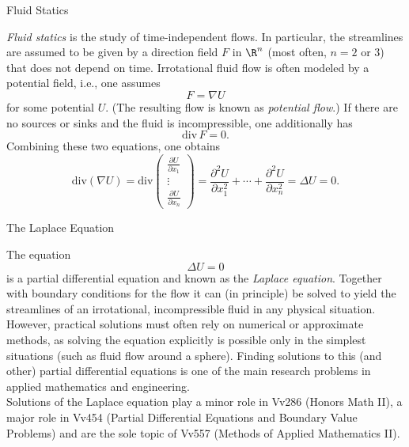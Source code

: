 \documentclass[smaller,hyperref={CJKbookmarks=true}]{beamer}
\begin{document}
\begin{frame}[t]{Fluid Statics}
\begin{spacing}{1}
\emph{Fluid statics} is the study of time-independent flows. In particular, the
streamlines are assumed to be given by a direction field $F$ in $\R^n$ (most
often, $n = 2$ or $3$) that does not depend on time. Irrotational fluid flow is
often modeled by a potential field, i.e., one assumes
\[F=\nabla U\]
for some potential $U$. (The resulting flow is known as \emph{potential flow}.) If
there are no sources or sinks and the fluid is incompressible, one
additionally has
\[\text{div}\,F=0.\]
Combining these two equations, one obtains
\[\text{div}(\nabla U)=\text{div}\begin{pmatrix}
               \frac{\partial U}{\partial x_1} \\
               \vdots \\
               \frac{\partial U}{\partial x_n}
             \end{pmatrix}=\frac{\partial^2U}{\partial x_1^2}+\cdots+\frac{\partial^2U}{\partial x_n^2}=\Delta U=0.\]
\end{spacing}
\end{frame}
\begin{frame}[t]{The Laplace Equation}
\begin{spacing}{1.1}
The equation
\[\Delta U=0\]
is a partial dif{}ferential equation and known as the \emph{Laplace equation}.
Together with boundary conditions for the flow it can (in principle) be
solved to yield the streamlines of an irrotational, incompressible fluid in
any physical situation.\\[5pt]
However, practical solutions must often rely on numerical or approximate
methods, as solving the equation explicitly is possible only in the simplest
situations (such as fluid flow around a sphere). Finding solutions to this
(and other) partial dif{}ferential equations is one of the main research
problems in applied mathematics and engineering.\\[5pt]
Solutions of the Laplace equation play a minor role in Vv286 (Honors
Math II), a major role in Vv454 (Partial Dif{}ferential Equations and
Boundary Value Problems) and are the sole topic of Vv557 (Methods of
Applied Mathematics II).
\end{spacing}
\end{frame}
\end{document}

